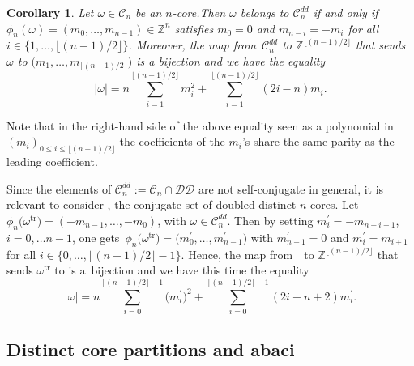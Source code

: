 \documentclass[pdftex]{sigma}
\newtheorem{Corollary}[Theorem]{Corollary}
\numberwithin{equation}{section}
\newcommand{\cC}{\mathcal{C}}
\def\ccdd{\mathcal {DD}}
\newcommand{\Z}{\mathbb{Z}}
\begin{document}
\begin{Corollary}
	\label{cor:gkdd}Let $\omega \in \cC_{n}$ be an $n$-core.Then $\omega $
	belongs to $\cC_{n}^{dd}$ if and only if $\phi _{n}(\omega )=(m_{0},\dots
	,m_{n-1})\in \Z^{n}$ satisfies $m_{0}=0$ and $m_{n-i}=-m_{i}$ for all $i\in
	\{1,\dots ,\lfloor (n-1)/2\rfloor \}$. Moreover, the map from~$\cC_{n}^{dd}$
	to $\Z^{\lfloor (n-1)/2\rfloor }$ that sends $\omega $ to $\bigl(m_{1},\dots
	,m_{\lfloor (n-1)/2\rfloor }\bigr)$ is a bijection and we have the equality
	\begin{equation}
	\lvert \omega \rvert =n\sum_{i=1}^{\lfloor (n-1)/2\rfloor
	}m_{i}^{2}+\sum_{i=1}^{\lfloor (n-1)/2\rfloor }(2i-n)m_{i}. \label{eq:gkdd}
	\end{equation}
\end{Corollary}

Note that in the right-hand side of the above equality seen as a polynomial in $(m_i)_{0\leq i \leq \lfloor (n-1)/2\rfloor }$
 the coefficients of the $m_{i}$'s share the same parity as the leading coefficient.

Since the elements of $\cC_{n}^{dd}:=\cC_{n}\cap \ccdd$ are not
self-conjugate in general, it is relevant to consider \smash{$\cC_{n}^{dd,\mathrm{tr}}=\bigl(\cC_{n}^{dd}\bigr) ^{\mathrm{tr}}$}, the conjugate set of doubled distinct $%
n $ cores. Let~${\phi _{n}\bigl(\omega ^{\mathrm{tr}}\bigr)=(-m_{n-1},\dots ,-m_{0})}$,
with $\omega \in \cC_{n}^{dd}$. Then by setting $m_{i}^{\prime
}=-m_{n-i-1}$, $i=0,\dots n-1$, one gets~${\phi _{n}\bigl(\omega ^{\mathrm{tr}%
}\bigr)\!=\bigl(m_{0}^{\prime },\dots ,m_{n-1}^{\prime }\bigr)}$ with $m_{n-1}^{\prime }=0$
and $m_{i}^{\prime }=m_{i+1}$ for all $i\in \{0,\dots ,\lfloor
(n-1)/2\rfloor -1\}$. Hence, the map from~\smash{$\cC_{n}^{dd,\mathrm{tr}}$}~to $
\Z^{\lfloor (n-1)/2\rfloor }$ that sends $\omega ^{\mathrm{tr}}$ to  is a~bijection and
we have this time the equality
\begin{equation*}
\lvert \omega \rvert =n\sum_{i=0}^{\lfloor (n-1)/2\rfloor -1}\bigl(m_{i}^{\prime
}\bigr)^{2}+\sum_{i=0}^{\lfloor (n-1)/2\rfloor -1}(2i-n+2)m_{i}^{\prime }.
\end{equation*}



\subsection{Distinct core partitions and abaci}
\end{document}
